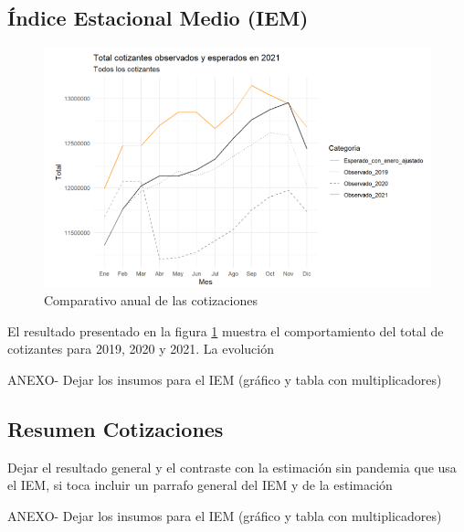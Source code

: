 


\subsection{Índice Estacional Medio (IEM)}

\begin{figure}
\includegraphics[width = 12.5cm]{figures/01_dinamica/serie_contraste.png}
\caption{Comparativo anual de las cotizaciones}
\label{figura:IEM_Total}
\end{figure}

El resultado presentado en la figura \ref{figura:IEM_Total} muestra el comportamiento del total de cotizantes para 2019, 2020 y 2021. La evolución 

ANEXO- Dejar los insumos para el IEM (gráfico y tabla con multiplicadores)%

\subsection{Resumen Cotizaciones}

Dejar el resultado general y el contraste con la estimación sin pandemia que usa el IEM, si toca incluir un parrafo general del IEM y de la estimación%

ANEXO- Dejar los insumos para el IEM (gráfico y tabla con multiplicadores)%


